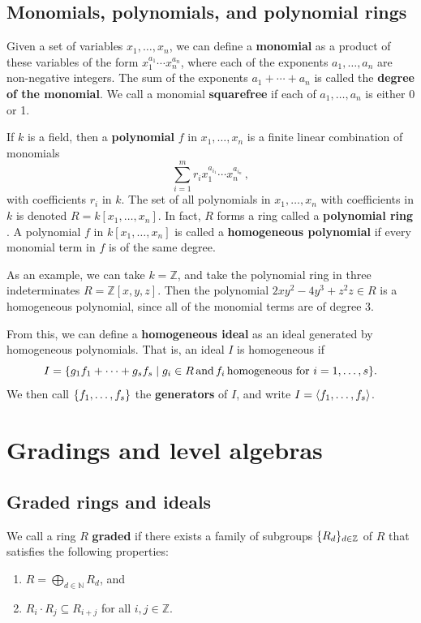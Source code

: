 \subsection{Monomials, polynomials, and polynomial rings}

Given a set of variables $x_1, \dots, x_n$, we can define a \textbf{monomial} as a product of these variables of the form $x_1^{a_1} \cdots x_n^{a_n}$, where each of the exponents $a_1, \dots, a_n$ are non-negative integers. The sum of the exponents $a_1 + \cdots + a_n$ is called the \textbf{degree of the monomial}. We call a monomial \textbf{squarefree} if each of $a_1, \dots, a_n$ is either 0 or 1.

If $k$ is a field, then a \textbf{polynomial} $f$ in $x_1, \dots, x_n$ is a finite linear combination of monomials
$$
\sum_{i=1}^{m} r_i x_1^{a_{i_1}} \cdots x_n^{a_{i_n}} \, ,
$$
with coefficients $r_i$ in $k$. The set of all polynomials in $x_1, \dots , x_n$ with coefficients in $k$ is denoted $R = k[x_1, \dots, x_n]$. In fact, $R$ forms a ring called a \textbf{polynomial ring} \cite{Cox2007}. A polynomial $f$ in $k[x_1, \dots, x_n]$ is called a \textbf{homogeneous polynomial} if every monomial term in $f$ is of the same degree. 

As an example, we can take $k = \mathbb{Z}$, and take the polynomial ring in three indeterminates  $R = \mathbb{Z} [x, y, z]$. Then the polynomial $2xy^2 - 4y^3 + z^2z \in R$ is a homogeneous polynomial, since all of the monomial terms are of degree 3.

From this, we can define a \textbf{homogeneous ideal} as an ideal generated by homogeneous polynomials. That is, an ideal $I$ is homogeneous if 
$$
I = \{ g_1 f_1 + \dots +  g_sf_s \; |\; g_i \in R \,\textrm{and} \,  f_i \,\textrm{homogeneous for } i = 1, \dots, s \}.
$$
We then call $\{ f_1, \dots, f_s \}$ the \textbf{generators} of $I$, and write $I = \langle f_1, \dots, f_s \rangle$.

\section{Gradings and level algebras} \label{sec:gradings}

\subsection{Graded rings and ideals}
We call a ring $R$ \textbf{graded} if there exists a family of subgroups $\{ R_d \}_{d \in \mathbb{Z}}$ of $R$ that satisfies the following properties:
\begin{enumerate}
	\item $R = \bigoplus\limits_{d \in \mathbb{N}} R_d$, and
    \item $R_i \cdot R_j \subseteq R_{i+j}$ for all $i, j \in \mathbb{Z}$.
\end{enumerate}

